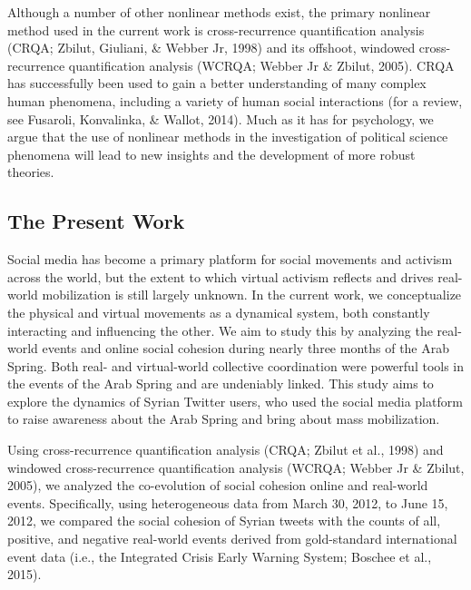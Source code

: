 \documentclass[english,man]{apa6}
\begin{document}
Although a number of other nonlinear methods exist,
the primary nonlinear method used in the current work is cross-recurrence
quantification analysis (CRQA; Zbilut, Giuliani, \& Webber Jr, 1998) and its offshoot,
windowed cross-recurrence quantification analysis (WCRQA; Webber Jr \& Zbilut, 2005).
CRQA has successfully been used to gain a better understanding of many
complex human phenomena, including a variety of human social interactions
(for a review, see Fusaroli, Konvalinka, \& Wallot, 2014).
Much as it has for psychology, we argue that the use of nonlinear methods in
the investigation of political science phenomena will lead to new insights
and the development of more robust theories.

\hypertarget{the-present-work}{%
\subsection{The Present Work}\label{the-present-work}}

Social media has become a primary platform for social movements and
activism across the world, but the extent to which virtual activism
reflects and drives real-world mobilization is still largely unknown.
In the current work, we
conceptualize the physical and virtual movements as a dynamical system,
both constantly interacting and influencing the other. We aim to study
this by analyzing the real-world events and online social cohesion
during nearly three months of the Arab Spring. Both real- and
virtual-world collective coordination were powerful tools in the events
of the Arab Spring and are undeniably linked. This study aims to explore
the dynamics of Syrian Twitter users, who used the social media platform to raise
awareness about the Arab Spring and bring about mass mobilization.

Using cross-recurrence quantification analysis (CRQA; Zbilut et al., 1998)
and windowed cross-recurrence quantification analysis
(WCRQA; Webber Jr \& Zbilut, 2005), we analyzed the co-evolution of social
cohesion online and real-world events. Specifically, using heterogeneous
data from March 30, 2012, to June 15, 2012, we compared the social cohesion
of Syrian tweets with the counts
of all, positive, and negative real-world events derived from gold-standard
international event data (i.e., the Integrated Crisis Early Warning
System; Boschee et al., 2015).
\end{document}
